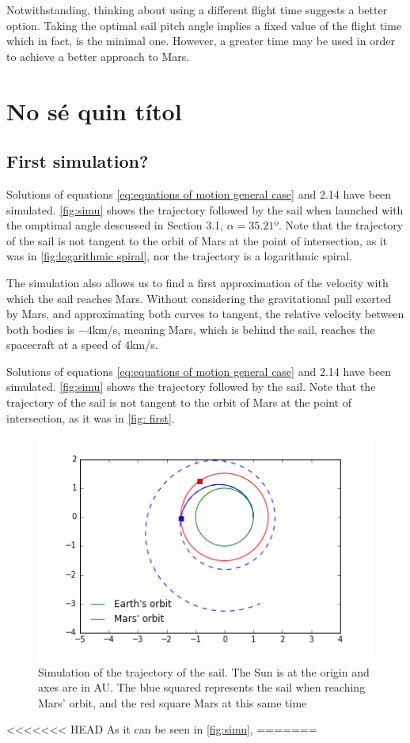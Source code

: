 \documentclass[twocolumn,12pt,a4paper]{article}
\numberwithin{equation}{section}
\begin{document}
Notwithstanding, thinking about using a different flight time suggests a better option. Taking the optimal sail pitch angle implies a fixed value of the flight time which in fact, is the minimal one. However, a greater time may be used in order to achieve a better approach to Mars.
\section{No sé quin títol}
\subsection{First simulation?}
Solutions of equations \ref{eq:equations of motion general case} and 2.14 have been simulated. \autoref{fig:simu} shows the trajectory followed by the sail when launched with the omptimal angle descussed in Section 3.1, $\alpha=35.21º$. Note that the trajectory of the sail is not tangent to the orbit of Mars at the point of intersection, as it was in \autoref{fig:logarithmic spiral}, nor the trajectory is a logarithmic spiral.

The simulation also allows us to find a first approximation of the velocity with which the sail reaches Mars. Without considering the gravitational pull exerted by Mars, and approximating both curves to tangent, the relative velocity between both bodies is $-4$km/s, meaning Mars, which is behind the sail, reaches the spacecraft at a speed of $4$km/s.

Solutions of equations \ref{eq:equations of motion general case} and 2.14 have been simulated. \autoref{fig:simu} shows the trajectory followed by the sail. Note that the trajectory of the sail is not tangent to the orbit of Mars at the point of intersection, as it was in \autoref{fig: first}.


\begin{figure}[h]
	\centering
	\includegraphics[scale=0.5]{simu.png}
	\caption{\small Simulation of the trajectory of the sail. The Sun is at the origin and axes are in AU. The blue squared represents the sail when reaching Mars' orbit, and the red square Mars at this same time}
	\label{fig:simu}
\end{figure}
<<<<<<< HEAD
As it can be seen in \autoref{fig:simu},  
=======
 
\end{document}
